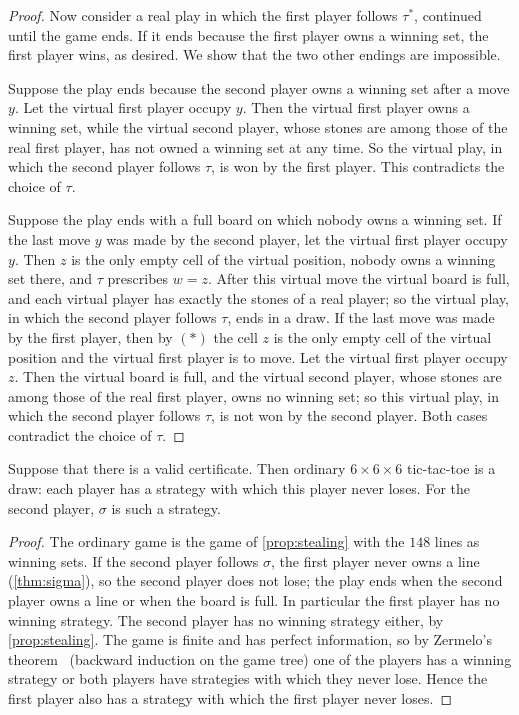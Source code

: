 \begin{proof}
Now consider a real play in which the first player follows $\tau^*$, continued until the game ends. If it
ends because the first player owns a winning set, the first player wins, as desired. We show that the two
other endings are impossible.

Suppose the play ends because the second player owns a winning set after a move $y$. Let the virtual first
player occupy $y$. Then the virtual first player owns a winning set, while the virtual second player, whose
stones are among those of the real first player, has not owned a winning set at any time. So the virtual
play, in which the second player follows $\tau$, is won by the first player. This contradicts the choice of
$\tau$.

Suppose the play ends with a full board on which nobody owns a winning set. If the last move $y$ was made
by the second player, let the virtual first player occupy $y$. Then $z$ is the only empty cell of the virtual
position, nobody owns a winning set there, and $\tau$ prescribes $w=z$. After this virtual move the virtual
board is full, and each virtual player has exactly the stones of a real player; so the virtual play, in
which the second player follows $\tau$, ends in a draw. If the last move was made by the first player, then
by $(\ast)$ the cell $z$ is the only empty cell of the virtual position and the virtual first player is to
move. Let the virtual first player occupy $z$. Then the virtual board is full, and the virtual second
player, whose stones are among those of the real first player, owns no winning set; so this virtual play, in
which the second player follows $\tau$, is not won by the second player. Both cases contradict the choice of
$\tau$.
\end{proof}

\begin{corollary}[Draw]\label{cor:draw}
Suppose that there is a valid certificate. Then ordinary $6\times6\times6$ tic-tac-toe is a draw: each player
has a strategy with which this player never loses. For the second player, $\sigma$ is such a strategy.
\end{corollary}

\begin{proof}
The ordinary game is the game of \cref{prop:stealing} with the $148$ lines as winning sets. If the
second player follows $\sigma$, the first player never owns a line (\cref{thm:sigma}), so the second
player does not lose; the play ends when the second player owns a line or when the board is full. In
particular the first player has no winning strategy. The second player has no winning strategy either, by
\cref{prop:stealing}. The game is finite and has perfect information, so by Zermelo's theorem~\cite{Zermelo1913}
(backward induction on the game tree) one of the players has a winning strategy or both players have
strategies with which they never lose. Hence the first player also has a strategy with which
the first player never loses.
\end{proof}

